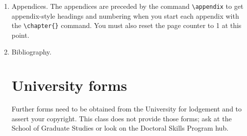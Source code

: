 \begin{enumerate}
	Save each chapter in its own file, and use the \verb++ command (or \verb++) to incorporate them.

\item Appendices. The appendices are preceded by the command \verb+\appendix+ to get appendix-style headings and numbering when you start each appendix with the \verb+\chapter{}+ command. You must also reset the page counter to 1 at this point.

\item Bibliography.
\section{University forms}
Further forms need to be obtained from the University for lodgement and to assert your copyright. This class does not provide those forms; ask at the School of Graduate Studies or look on the Doctoral Skills Program hub.

\end{enumerate}